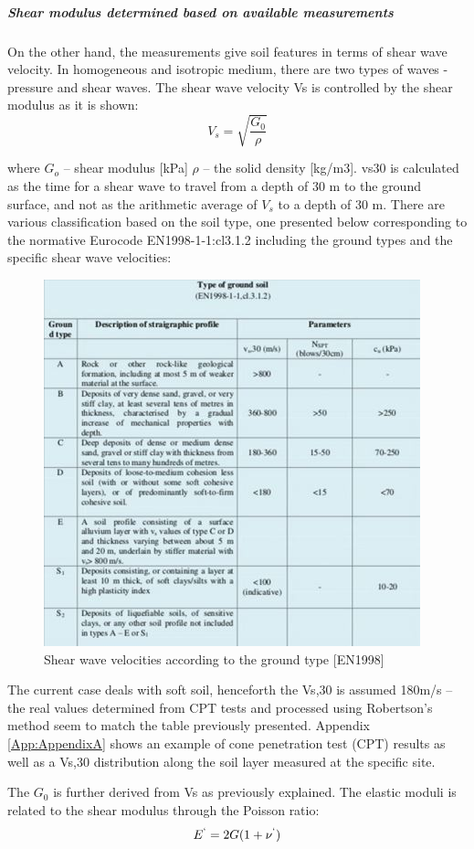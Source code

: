 \documentclass[11pt,a4paper]{report}
\begin{document}
\subparagraph{Shear modulus determined based on available measurements }
On the other hand, the measurements give soil features in terms of shear wave velocity. In homogeneous and isotropic medium, there are two types of waves - pressure and shear waves. The shear wave velocity Vs is controlled by the shear modulus as it is shown:
\begin{equation}
	V_s=\sqrt{\frac{G_0}{\rho}}
\end{equation}

where
$G_o$ – shear modulus [kPa]
$\rho$ – the solid density [kg/m3]. 
\gls{vs30} is calculated as the time for a shear wave to travel from a depth of 30 m to the ground surface, and not as the arithmetic average of $V_s$ to a depth of 30 m. There are various classification based on the soil type, one presented below corresponding to the normative Eurocode EN1998-1-1:cl3.1.2 including the ground types and the specific shear wave velocities:  
\begin{figure}[h!]
	\centering
	\includegraphics[width=0.7\linewidth]{"EC8"}
	\caption{Shear wave velocities according to the ground type [EN1998]}
	\label{EC8}
\end{figure}

The current case deals with soft soil, henceforth the Vs,30 is assumed 180m/s –the real values determined from CPT tests and processed using Robertson’s method seem to match the table previously presented. Appendix \ref{App:AppendixA} shows an example of cone penetration test (CPT) results as well as a Vs,30 distribution along the soil layer measured at the specific site. 

The $G_0$ is further derived from Vs as previously explained. The elastic moduli is related to the shear modulus through the Poisson ratio:
\begin{equation}
	E^`=2G(1+\nu^`)
\end{equation}
\end{document}
